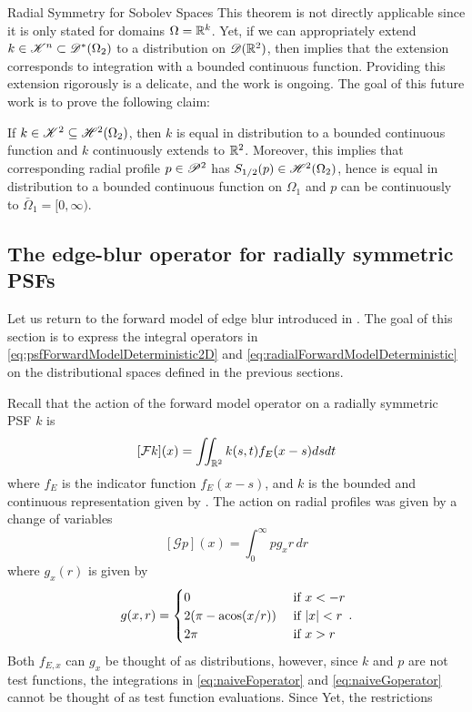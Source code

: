 \begin{chapter}{Radial Symmetry for Sobolev Spaces}
This theorem is not directly applicable since it is only stated for domains $\Omega = \mathbb R^k$.
Yet, if we can appropriately extend $k \in \mathscr K^n \subset \mathscr D^*(\Omega_2)$ to a distribution on $\mathscr D(\mathbb R^2)$, then  implies that the extension corresponds to integration with a bounded continuous function.
Providing this extension rigorously is a delicate, and the work is ongoing.
The goal of this future work is to prove the following claim:

\begin{claim} \label{claim:pspace}
  If $k \in \mathscr K^2 \subseteq \mathscr H^2(\Omega_2)$, then $k$ is equal in distribution to a bounded continuous function and $k$ continuously extends to $\mathbb R^2$. 
  Moreover, this implies that corresponding radial profile $p \in \mathscr P^2$ has $S_{1/2}(p) \in \mathscr H^2(\Omega_2)$, hence is equal in distribution to a bounded continuous function on $\Omega_1$ and $p$ can be continuously to $\bar \Omega_1 = [0,\infty)$.
\end{claim}

\begin{com}
\subsection{The edge-blur operator for radially symmetric PSFs}
Let us return to the forward model of edge blur introduced in .
The goal of this section is to express the integral operators in \eqref{eq:psfForwardModelDeterministic2D} and \eqref{eq:radialForwardModelDeterministic} on the distributional spaces defined in the previous sections.

Recall that the action of the forward model operator on a radially symmetric PSF $k$ is
\begin{equation} \label{eq:naiveFoperator}
  [\mathcal F k](x) = \iint_{\mathbb R^2} k(s,t) f_{E}(x-s) dsdt
\end{equation}
where $f_{E}$ is the indicator function $f_E(x-s)$, and $k$ is the bounded and continuous representation given by .
The action on radial profiles was given by a change of variables
\begin{equation}\label{eq:naiveGoperator}
    [\mathcal Gp](x) = \int_0^\infty p g_x r\,dr
\end{equation}
where $g_x(r)$ is given by
\begin{equation} 
  g(x,r) = \begin{cases}
    0 &\text{ if } x < - r\\
    2(\pi - \operatorname*{acos}(x/r)) &\text{ if } |x| < r\\
    2\pi & \text{ if } x> r
  \end{cases}.
  \label{g_form}
\end{equation}
Both $f_{E,x}$ can $g_x$ be thought of as distributions, however, since $k$ and $p$ are not test functions, the integrations in \eqref{eq:naiveFoperator} and \eqref{eq:naiveGoperator} cannot be thought of as test function evaluations.
Since 
Yet, the restrictions 



\end{com}
\end{chapter}
